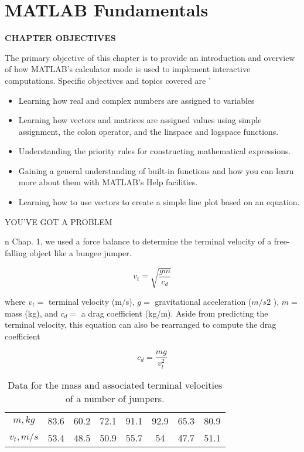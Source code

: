 \documentclass[../main.tex]{subfiles}
\begin{document}
\chapter{MATLAB Fundamentals}




\begin{center}
\Large{\textbf{CHAPTER OBJECTIVES}}
\end{center}

\normalsize{The primary objective of this chapter is to provide an introduction and overview of
how MATLAB's calculator mode is used to implement interactive computations.
Specific objectives and topics covered are}
'
\begin{itemize}


	\item Learning how real and complex numbers are assigned to variables
	\item  Learning how vectors and matrices are assigned values using simple assignment,
the colon operator, and the linspace and logspace functions.
\item  Understanding the priority rules for constructing mathematical expressions.
\item  Gaining a general understanding of built-in functions and how you can learn more
about them with MATLAB's Help facilities.
\item  Learning how to use vectors to create a simple line plot based on an equation.
\end{itemize}
\Large{YOU'VE GOT A PROBLEM}
\normalsize

n Chap. 1, we used a force balance to determine the terminal velocity of a free-falling
object like a bungee jumper.

$$v_t=\sqrt{\dfrac{gm}{c_d}}  $$

where $v_t =$ terminal velocity (m/s), $g =$ gravitational acceleration ($m/s2$
), $m =$ mass (kg),
and $c_d =$ a drag coefficient (kg/m). Aside from predicting the terminal velocity, this equation can also be rearranged to compute the drag coefficient
 
\begin{equation}
	\tag{2.1}
	c_d = \dfrac{mg}{v^2_t}
\end{equation} 



	\begin{table}[H]
		\centering
		\caption{Data for the mass and associated terminal velocities of a number of jumpers.}
		\begin{tabular}{cccccccc}
			\hline
			$m, kg$ 	&83.6 &60.2 &72.1 &91.1 &92.9 &65.3 &80.9\\
			$v_t, m/s$ &53.4 &48.5 &50.9 &55.7 &54 &47.7 &51.1\\
			\hline
			
		\end{tabular}
	\end{table}
\end{document}
